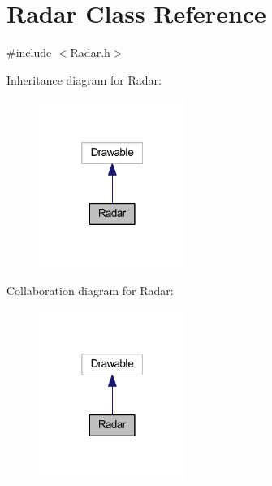 \hypertarget{class_radar}{}\section{Radar Class Reference}
\label{class_radar}


{\ttfamily \#include $<$Radar.\+h$>$}



Inheritance diagram for Radar\+:\nopagebreak
\begin{figure}[H]
\begin{center}
\leavevmode
\includegraphics[width=136pt]{class_radar__inherit__graph}
\end{center}
\end{figure}


Collaboration diagram for Radar\+:\nopagebreak
\begin{figure}[H]
\begin{center}
\leavevmode
\includegraphics[width=136pt]{class_radar__coll__graph}
\end{center}
\end{figure}
